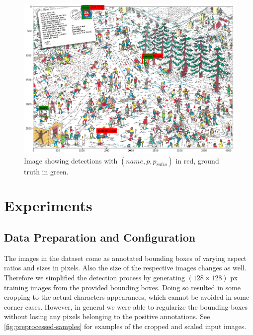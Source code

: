 \documentclass[11pt]{article}
\begin{document}
\begin{figure}
    \centering
    \includegraphics[width=0.8\linewidth]{figures/waldo_winter} 
    \caption{Image showing detections with \( (name, p, p_{ratio}) \) in red, ground truth in green.}
    \label{fig:waldo-winter}
\end{figure}

\section{Experiments}
\subsection{Data Preparation and Configuration}\label{subsec:data-prep}

The images in the dataset come as annotated bounding boxes of varying aspect ratios and sizes in pixels.
Also the size of the respective images changes as well. Therefore we simplified the detection process by
generating \( (128 \times 128) \) px training images from the provided bounding boxes. 
Doing so resulted in some cropping to the actual characters appearances, which cannot be avoided in some corner cases.
However, in general we were able to regularize the bounding boxes without losing any pixels belonging to the positive annotations.
See \autoref{fig:preprocessed-samples} for examples of the cropped and scaled input images.
\end{document}
